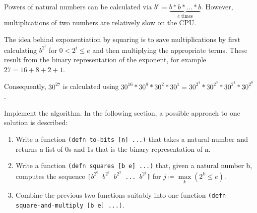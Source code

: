 \documentclass[11pt,a4paper]{article}
\begin{document}
\begin{exercise}

Powers of natural numbers can be calculated via $b^e = \underbrace{b * b * ... * b}_{e\text{ times}}$.
However, multiplications of two numbers are relatively slow on the CPU.

The idea behind exponentiation by squaring is to save multiplications by first calculating $b^{2^i}$ for $0 < 2^i \leq e$ and then multiplying the appropriate terms. These result from the binary representation of the exponent, for example $27 = 16 + 8 + 2 + 1$.

Consequently, $30^{27}$ is calculated using $30^{16} * 30^8 * 30^2 * 30^1 = 30^{2^4} * 30^{2^3} * 30^{2^1} * 30^{2^0}$.

Implement the algorithm. In the following section, a possible approach to one solution is described:

\begin{enumerate}[label=\alph*)]
\item
  Write a function \texttt{(defn to-bits [n] ...)} that takes a natural number and returns a list of 0s and 1s that is the binary representation of n.
\item 
    Write a function \texttt{(defn squares [b e] ...)} that, given a natural number b, computes the sequence \texttt{[$b^{2^0}$ $b^{2^1}$ $b^{2^2}$ ... $b^{2^j}$]} for $j \coloneqq \max\limits_{k} (2^k \leq e)$.
\item
  Combine the previous two functions suitably into one function \texttt{(defn square-and-multiply [b e] ...)}.
\end{enumerate}
\end{exercise}
\end{document}
